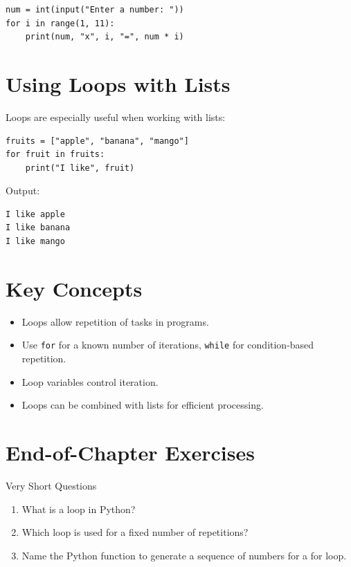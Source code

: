 \begin{verbatim}
num = int(input("Enter a number: "))
for i in range(1, 11):
    print(num, "x", i, "=", num * i)
\end{verbatim}

\section{Using Loops with Lists}

Loops are especially useful when working with lists:

\begin{verbatim}
fruits = ["apple", "banana", "mango"]
for fruit in fruits:
    print("I like", fruit)
\end{verbatim}

Output:

\begin{verbatim}
I like apple
I like banana
I like mango
\end{verbatim}

\section{Key Concepts}

\begin{itemize}
    \item Loops allow repetition of tasks in programs.  
    \item Use \texttt{for} for a known number of iterations, \texttt{while} for condition-based repetition.  
    \item Loop variables control iteration.  
    \item Loops can be combined with lists for efficient processing.  
\end{itemize}

\section{End-of-Chapter Exercises}

\begin{exercise}{Very Short Questions}
\begin{enumerate}
    \item What is a loop in Python?  
    \item Which loop is used for a fixed number of repetitions?  
    \item Name the Python function to generate a sequence of numbers for a for loop.  
\end{enumerate}
\end{exercise}

